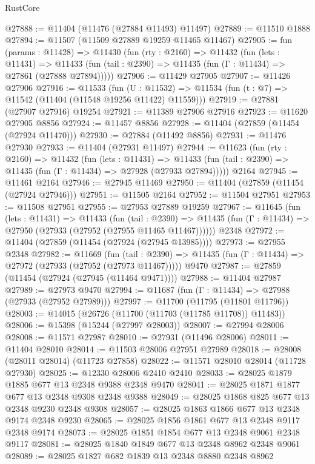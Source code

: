 \begin{lexlean}{RustCore}
\begin{coremodule}
@27888 := @11404 (@11476 (@27884 @11493) @11497)
@27889 := @11510 @1888
@27894 := @11507 (@11509 @27889 @19259 @11465 @11467)
@27905 := fun (params : @11428) =>
  @11430
    (fun (rty : @2160) =>
    @11432
      (fun (lets : @11431) =>
      @11433 (fun (tail : @2390) => @11435 (fun (Γ : @11434) => @27861 (@27888 @27894)))))
@27906 := @11429 @27905
@27907 := @11426 @27906
@27916 := @11533
    (fun (U : @11532) => @11534 (fun (t : @7) => @11542 (@11404 (@11548 @19256 @11422) @11559)))
@27919 := @27881 (@27907 @27916) @19254
@27921 := @11389 @27906 @27916
@27923 := @11620 @27905 @8856
@27924 := @11457 @8856
@27928 := @11404 (@27859 (@11454 (@27924 @11470)))
@27930 := @27884 (@11492 @8856)
@27931 := @11476 @27930
@27933 := @11404 (@27931 @11497)
@27944 := @11623
    (fun (rty : @2160) =>
    @11432
      (fun (lets : @11431) =>
      @11433 (fun (tail : @2390) => @11435 (fun (Γ : @11434) => @27928 (@27933 @27894)))))
    @2164
@27945 := @11461 @2164
@27946 := @27945 @11469
@27950 := @11404 (@27859 (@11454 (@27924 @27946)))
@27951 := @11505 @2164
@27952 := @11504 @27951
@27953 := @11508 @27951
@27955 := @27953 @27889 @19259
@27967 := @11645
    (fun (lets : @11431) =>
    @11433
      (fun (tail : @2390) =>
      @11435 (fun (Γ : @11434) => @27950 (@27933 (@27952 (@27955 @11465 @11467))))))
    @2348
@27972 := @11404 (@27859 (@11454 (@27924 (@27945 @13985))))
@27973 := @27955 @2348
@27982 := @11669
    (fun (tail : @2390) => @11435 (fun (Γ : @11434) => @27972 (@27933 (@27952 (@27973 @11467)))))
    @9470
@27987 := @27859 (@11454 (@27924 (@27945 (@11464 @9471))))
@27988 := @11404 @27987
@27989 := @27973 @9470
@27994 := @11687 (fun (Γ : @11434) => @27988 (@27933 (@27952 @27989)))
@27997 := @11700 (@11795 (@11801 @11796))
@28003 := @14015 (@26726 (@11700 (@11703 (@11785 @11708)) @11483))
@28006 := @15398 (@15244 (@27997 @28003))
@28007 := @27994 @28006
@28008 := @11571 @27987
@28010 := @27931 (@11496 @28006)
@28011 := @11404 @28010
@28014 := @11503 @28006 @27951 @27989
@28018 := @28008 (@28011 @28014) (@11723 @27858)
@28022 := @11571 @28010 @28014 (@11728 @27930)
@28025 := @12330 @28006 @2410 @2410
@28033 := @28025 @1879 @1885 @677 @13 @2348 @9388 @2348 @9470
@28041 := @28025 @1871 @1877 @677 @13 @2348 @9308 @2348 @9388
@28049 := @28025 @1868 @825 @677 @13 @2348 @9230 @2348 @9308
@28057 := @28025 @1863 @1866 @677 @13 @2348 @9174 @2348 @9230
@28065 := @28025 @1856 @1861 @677 @13 @2348 @9117 @2348 @9174
@28073 := @28025 @1851 @1854 @677 @13 @2348 @9061 @2348 @9117
@28081 := @28025 @1840 @1849 @677 @13 @2348 @8962 @2348 @9061
@28089 := @28025 @1827 @682 @1839 @13 @2348 @8880 @2348 @8962

\end{coremodule}
\end{lexlean}
